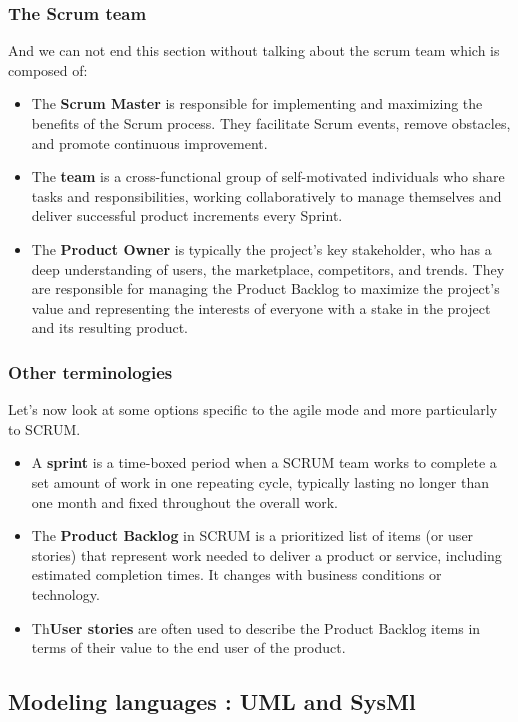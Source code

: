 \subsubsection{The Scrum team}
And we can not end this section without talking about the scrum team  which is composed of:
\begin{itemize}

\item The \textbf{Scrum Master} is responsible for implementing and maximizing the benefits of the Scrum process. They facilitate Scrum events, remove obstacles, and promote continuous improvement.\cite{PGC10}
\item The \textbf{team} is a cross-functional group of self-motivated individuals who share tasks and responsibilities, working collaboratively to manage themselves and deliver successful product increments every Sprint.\cite{PGC10}
\item The \textbf{Product Owner} is typically the project's key stakeholder, who has a deep understanding of users, the marketplace, competitors, and trends. They are responsible for managing the Product Backlog to maximize the project's value and representing the interests of everyone with a stake in the project and its resulting product.\cite{PGC10}
\end{itemize}
\subsubsection{Other terminologies}
Let's now look at some options specific to the agile mode and more particularly to SCRUM.
\begin{itemize}
\item A \textbf{sprint} is a time-boxed period when a SCRUM team works to complete a set amount of work in one repeating cycle, typically lasting no longer than one month and fixed throughout the overall work.\cite{PGC10}
\item The \textbf{Product Backlog}   in SCRUM is a prioritized list of items (or user stories) that represent work needed to deliver a product or service, including estimated completion times. It changes with business conditions or technology.\cite{PGC10}
\item Th\textbf{User stories} are often used to describe the Product Backlog items in terms of their value to the end user of the product.\cite{PGC10}
\end{itemize}
\subsection{Modeling languages : UML and SysMl}
